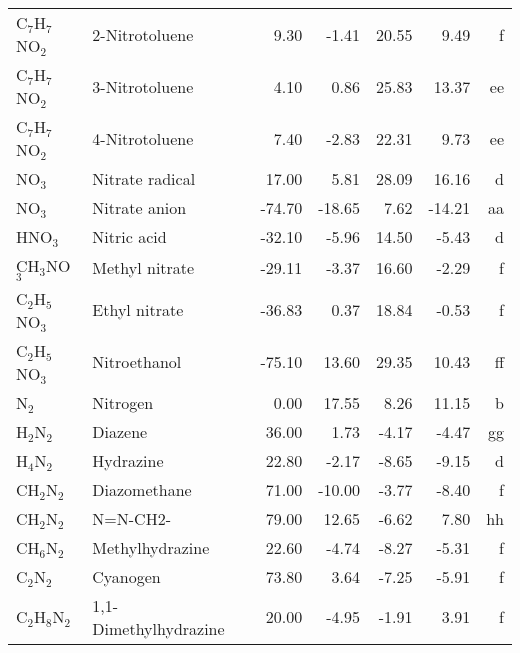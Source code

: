 \begin{table}
\begin{center}
\begin{tabular}{llrrrrr}
 C$_7$H$_7$NO$_2$     & 2-Nitrotoluene                  &     9.30    &    -1.41  &    20.55  &     9.49  &      f\\
 C$_7$H$_7$NO$_2$     & 3-Nitrotoluene                  &     4.10    &     0.86  &    25.83  &    13.37  &     ee\\
 C$_7$H$_7$NO$_2$     & 4-Nitrotoluene                  &     7.40    &    -2.83  &    22.31  &     9.73  &     ee\\
 NO$_3$         & Nitrate radical                 &    17.00    &     5.81  &    28.09  &    16.16  &      d\\
 NO$_3$         & Nitrate anion                   &   -74.70    &   -18.65  &     7.62  &   -14.21  &     aa\\
 HNO$_3$        & Nitric acid                     &   -32.10    &    -5.96  &    14.50  &    -5.43  &      d\\
 CH$_3$NO$_3$      & Methyl nitrate                  &   -29.11    &    -3.37  &    16.60  &    -2.29  &      f\\
 C$_2$H$_5$NO$_3$     & Ethyl nitrate                   &   -36.83    &     0.37  &    18.84  &    -0.53  &      f\\
 C$_2$H$_5$NO$_3$     & Nitroethanol                    &   -75.10    &    13.60  &    29.35  &    10.43  &     ff\\
 N$_2$          & Nitrogen                        &     0.00    &    17.55  &     8.26  &    11.15  &      b\\
 H$_2$N$_2$        & Diazene                         &    36.00    &     1.73  &    -4.17  &    -4.47  &     gg\\
 H$_4$N$_2$        & Hydrazine                       &    22.80    &    -2.17  &    -8.65  &    -9.15  &      d\\
 CH$_2$N$_2$       & Diazomethane                    &    71.00    &   -10.00  &    -3.77  &    -8.40  &      f\\
 CH$_2$N$_2$       & N=N-CH2-                        &    79.00    &    12.65  &    -6.62  &     7.80  &     hh\\
 CH$_6$N$_2$       & Methylhydrazine                 &    22.60    &    -4.74  &    -8.27  &    -5.31  &      f\\
 C$_2$N$_2$        & Cyanogen                        &    73.80    &     3.64  &    -7.25  &    -5.91  &      f\\
 C$_2$H$_8$N$_2$      & 1,1-Dimethylhydrazine           &    20.00    &    -4.95  &    -1.91  &     3.91  &      f\\

\end{tabular}
\end{center}
\end{table}
